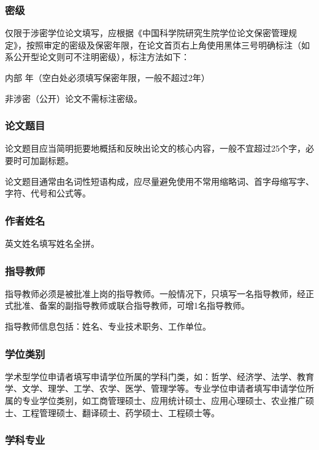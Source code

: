 \documentclass[a4paper,12pt,oneside,openany]{book}
\begin{document}
\subsubsection{密级}

仅限于涉密学位论文填写，应根据《中国科学院研究生院学位论文保密管理规定》，按照审定的密级及保密年限，在论文首页右上角使用黑体三号明确标注（如系公开型论文则可不注明密级），标注方法如下：

内部 年（空白处必须填写保密年限，一般不超过2年）



非涉密（公开）论文不需标注密级。 


\subsubsection{论文题目}

论文题目应当简明扼要地概括和反映出论文的核心内容，一般不宜超过25个字，必要时可加副标题。

论文题目通常由名词性短语构成，应尽量避免使用不常用缩略词、首字母缩写字、字符、代号和公式等。 


\subsubsection{作者姓名}

英文姓名填写姓名全拼。


\subsubsection{指导教师}

指导教师必须是被批准上岗的指导教师。一般情况下，只填写一名指导教师，经正式批准、备案的副指导教师或联合指导教师，可增1名指导教师。

指导教师信息包括：姓名、专业技术职务、工作单位。 


\subsubsection{学位类别}

学术型学位申请者填写申请学位所属的学科门类，如：哲学、经济学、法学、教育学、文学、理学、工学、农学、医学、管理学等。专业学位申请者填写申请学位所属的专业学位类别，如工商管理硕士、应用统计硕士、应用心理硕士、农业推广硕士、工程管理硕士、翻译硕士、药学硕士、工程硕士等。


\subsubsection{学科专业}
\end{document}
